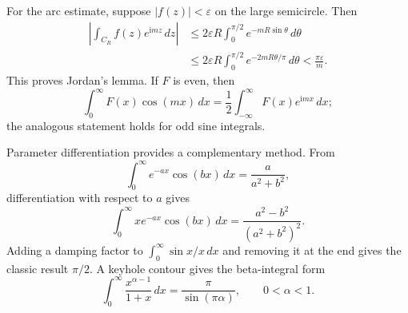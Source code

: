 For the arc estimate, suppose $|f(z)|<\varepsilon$ on the large semicircle. Then
\begin{align}
\left|\int_{C_R}f(z)e^{\mathrm{i}mz}\,dz\right|
&\leq2\varepsilon R\int_0^{\pi/2}e^{-mR\sin\theta}\,d\theta\nonumber\\
&\leq2\varepsilon R\int_0^{\pi/2}e^{-2mR\theta/\pi}\,d\theta
<\frac{\pi\varepsilon}{m}.
\end{align}
This proves Jordan's lemma. If $F$ is even, then
\begin{equation}
\int_0^\infty F(x)\cos(mx)\,dx
=\frac12\int_{-\infty}^{\infty}F(x)e^{\mathrm{i}mx}\,dx;
\end{equation}
the analogous statement holds for odd sine integrals.

Parameter differentiation provides a complementary method. From
\begin{equation}
\int_0^\infty e^{-ax}\cos(bx)\,dx=\frac{a}{a^2+b^2},
\end{equation}
differentiation with respect to $a$ gives
\begin{equation}
\int_0^\infty xe^{-ax}\cos(bx)\,dx=\frac{a^2-b^2}{(a^2+b^2)^2}.
\end{equation}
Adding a damping factor to $\int_0^\infty\sin x/x\,dx$ and removing it at the end gives the classic result $\pi/2$. A keyhole contour gives the beta-integral form
\begin{equation}
\int_0^\infty\frac{x^{\alpha-1}}{1+x}\,dx=\frac{\pi}{\sin(\pi\alpha)},\qquad 0<\alpha<1.
\end{equation}